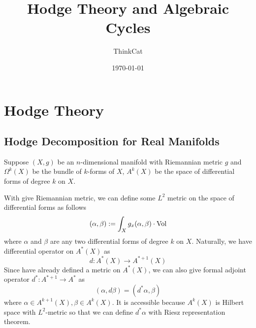 \documentclass[11pt,oneside,a4paper]{amsbook}
\title{Hodge Theory and Algebraic Cycles}
\author{ThinkCat}
\date{\today}
\begin{document}
\maketitle
\tableofcontents
\chapter{Hodge Theory}
\section{Hodge Decomposition for Real Manifolds}
Suppose $(X,g)$ be an $n$-dimensional manifold with Riemannian metric $g$ and $\Omega^k (X)$ be the bundle of $k$-forms of $X$, $A^k (X)$ be the space of differential forms of degree $k$ on $X$.

With give Riemannian metric, we can define some $L^2$ metric on the space of differential forms as follows
$$
(\alpha, \beta) := \int_{X} g_x(\alpha, \beta) \cdot \operatorname*{Vol}   
$$
where $\alpha$ and $\beta$ are any two differential forms of degree $k$ on $X$. Naturally, we have differential operator on $A^*(X)$ as
$$
d: A^*(X) \rightarrow A^{*+1}(X)
$$
Since have already defined a metric on $A^*(X)$,  we can also give formal adjoint operator $d^*: A^{*+1} \rightarrow A^*$ as
$$
(\alpha, d\beta)=(d^*\alpha, \beta)
$$
where $\alpha \in A^{k+1}(X), \beta \in A^k(X)$. It is accessible because $A^k(X)$ is Hilbert space with $L^2$-metric so that we can define $d^* \alpha$ with Riesz representation theorem.
\end{document}
